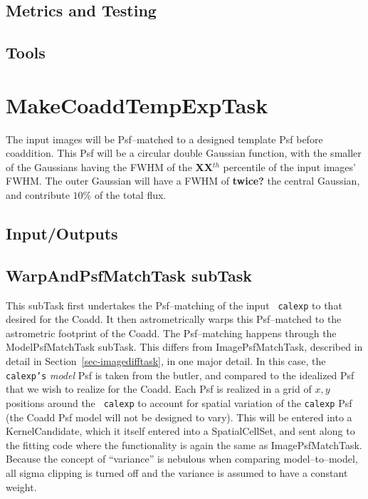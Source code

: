\documentclass[12pt]{article}
\begin{document}
\subsection{Metrics and Testing}
\subsection{Tools}


\clearpage 
\section{MakeCoaddTempExpTask} 

The input images will be Psf--matched to a designed template Psf
before coaddition.  This Psf will be a circular double Gaussian
function, with the smaller of the Gaussians having the FWHM of the
{\bf XX}$^{th}$ percentile of the input images' FWHM.  The outer
Gaussian will have a FWHM of {\bf twice?} the central Gaussian, and
contribute {\bf $10\%$} of the total flux.

\subsection{Input/Outputs}

\subsection{WarpAndPsfMatchTask subTask}
This subTask first undertakes the Psf--matching of the input {\tt
  calexp} to that desired for the Coadd.  It then astrometrically
warps this Psf--matched to the astrometric footprint of the Coadd.
The Psf--matching happens through the ModelPsfMatchTask subTask.  This
differs from ImagePsfMatchTask, described in detail in
Section~\ref{sec-imagedifftask}, in one major detail.  In this case,
the {\tt calexp's} {\it model} Psf is taken from the butler, and
compared to the idealized Psf that we wish to realize for the Coadd.
Each Psf is realized in a grid of $x,y$ positions around the {\tt
  calexp} to account for spatial variation of the {\tt calexp} Psf
(the Coadd Psf model will not be designed to vary).  This will be
entered into a KernelCandidate, which it itself entered into a
SpatialCellSet, and sent along to the fitting code where the
functionality is again the same as ImagePsfMatchTask.  Because the
concept of ``variance'' is nebulous when comparing model--to--model,
all sigma clipping is turned off and the variance is assumed to have a
constant weight.
\end{document}
